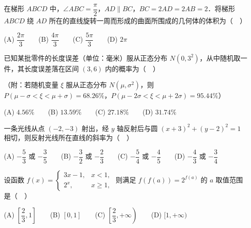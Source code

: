 \begin{question}

在梯形 $ABCD$ 中，$\angle ABC=\dfrac{\pi}{2}$，$AD\parallel BC$，$BC=2AD=2AB=2$．将梯形 $ABCD$ 绕 $AD$ 所在的直线旋转一周而形成的曲面所围成的几何体的体积为（　）

(A) $\dfrac{2\pi}{3}$　　(B) $\dfrac{4\pi}{3}$　　(C) $\dfrac{5\pi}{3}$　　(D) $2\pi$

\end{question}
\begin{question}

已知某批零件的长度误差（单位：毫米）服从正态分布 $N(0,3^2)$，从中随机取一件，其长度误差落在区间 $(3,6)$ 内的概率为（　）

（附：若随机变量 $\xi$ 服从正态分布 $N(\mu,\sigma^2)$，则 $P(\mu-\sigma<\xi<\mu+\sigma)=68.26\%$，$P(\mu-2\sigma<\xi<\mu+2\sigma)=95.44\%$）

(A) $4.56\%$　　(B) $13.59\%$　　(C) $27.18\%$　　(D) $31.74\%$

\end{question}
\begin{question}

一条光线从点 $(-2,-3)$ 射出，经 $y$ 轴反射后与圆 $(x+3)^2+(y-2)^2=1$ 相切，则反射光线所在直线的斜率为（　）

(A) $-\dfrac{5}{3}$ 或 $-\dfrac{3}{5}$　　(B) $-\dfrac{3}{2}$ 或 $-\dfrac{2}{3}$　　(C) $-\dfrac{5}{4}$ 或 $-\dfrac{4}{5}$　　(D) $-\dfrac{4}{3}$ 或 $-\dfrac{3}{4}$

\end{question}
\begin{question}

设函数 $f(x)=\begin{cases}3x-1,&x<1,\\2^x,&x\geqslant 1,\end{cases}$ 则满足 $f(f(a))=2^{f(a)}$ 的 $a$ 取值范围是（　）

(A) $\left[\dfrac{2}{3},1\right]$　　(B) $[0,1]$　　(C) $\left[\dfrac{2}{3},+\infty\right)$　　(D) $[1,+\infty)$

\end{question}

